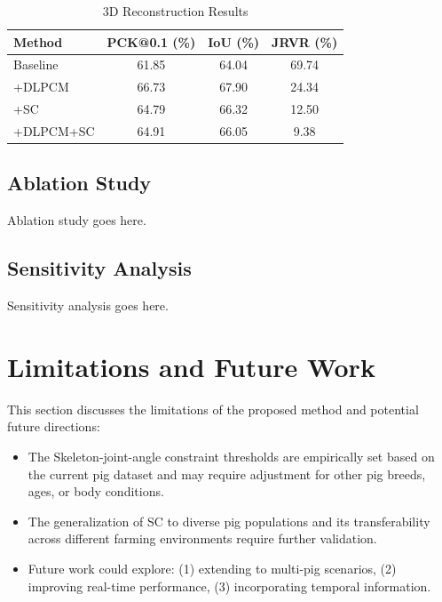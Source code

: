\documentclass[runningheads]{llncs}
\begin{document}
\begin{table}
\caption{3D Reconstruction Results}
\label{tab:results}
\begin{tabular}{lccc}
\toprule
Method & PCK@0.1 (\%) & IoU (\%) & JRVR (\%) \\
\midrule
Baseline & 61.85 & 64.04 & 69.74 \\
+DLPCM & 66.73 & 67.90 & 24.34 \\
+SC & 64.79 & 66.32 & 12.50 \\
+DLPCM+SC & 64.91 & 66.05 & 9.38 \\
\bottomrule
\end{tabular}
\end{table}

\subsection{Ablation Study}
\label{subsec:ablation}

Ablation study goes here.

\subsection{Sensitivity Analysis}
\label{subsec:sensitivity}

Sensitivity analysis goes here.

%
\section{Limitations and Future Work}
\label{sec:limitations}

This section discusses the limitations of the proposed method and potential 
future directions:

\begin{itemize}
\item The Skeleton-joint-angle constraint thresholds are empirically set based 
on the current pig dataset and may require adjustment for other pig breeds, 
ages, or body conditions.
\item The generalization of SC to diverse pig populations and its transferability 
across different farming environments require further validation.
\item Future work could explore: (1) extending to multi-pig scenarios, 
(2) improving real-time performance, (3) incorporating temporal information.
\end{itemize}
\end{document}

